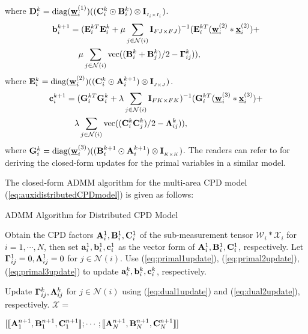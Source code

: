 \documentclass[journal]{IEEEtran}
\newcounter{thm}
\newcommand{\cpd}[3]{\llbracket #1, #2, #3 \rrbracket}
\newcommand{\A}{{\bf A}}
\newcommand{\B}{{\bf B}}
\newcommand{\C}{{\bf C}}
\newcommand{\D}{{\bf D}}
\newcommand{\E}{{\bf E}}
\newcommand{\Ten}[1]{\mathcal{#1}}
\newcommand{\andrey}[1]{\textcolor{red}{(Andrey says:  #1)}}
\newcommand{\revision}[1]{{\color{black} #1}} %
\newcommand{\bG}{{\bf G}}
\begin{document}
where $\D_i^k=\text{diag}(\underline{\bf w}_i^{(1)})((\C_i^k\odot \B_i^k)\otimes {\bf I}_{_{I_i\times I_i}})$.
\begin{align}
\label{eq:primal2update}
    {\bf b}_i^{k+1}
    &= (\E_i^{kT}\E_i^k+\mu\sum_{j\in\mathcal{N}(i)}{\bf I}_{{FJ\times FJ}})^{-1}(\E_i^{kT} (\underline{\bf w}_i^{(2)}* \underline{\bf x}_i^{(2)})+\nonumber\\
    &\quad\mu\sum_{j\in\mathcal{N}(i)}\text{vec}({(\B_i^{k}+\B_j^{k})}/{2}-{\bf{\Gamma}}_{ij}^{k})),
\end{align}
where $\E_i^k  =\text{diag}(\underline{\bf w}_i^{(2)})((\C_i^k\odot \A_i^{k+1})\otimes {\bf I}_{_{J\times J}})$.
\begin{align}
\label{eq:primal3update}
    {\bf c}_i^{k+1}
    &=(\bG_i^{kT}\bG_i^k+\lambda\sum_{j\in\mathcal{N}(i)}{\bf I}_{{FK\times FK}})^{-1}(\bG_i^{kT}(\underline{\bf w}_i^{(3)} * \underline{\bf x}_i^{(3)})+\nonumber\\
    &\quad\lambda\sum_{j\in\mathcal{N}(i)}\text{vec}((\C_i^{k}\C_j^{k})/{2}-{\bf{\Lambda}}_{ij}^{k})),
\end{align}
where  $\bG_i^k =\text{diag}(\underline{\bf w}_i^{(3)})((\B_i^{k+1}\odot \A_i^{k+1})\otimes {\bf I}_{_{K\times K}})$. \revision{The readers can refer to \cite{Liavas2015} for deriving the closed-form updates for the primal variables in a similar model.}

The closed-form ADMM algorithm for the multi-area CPD model (\ref{eq:auxidistributedCPDmodel}) is given as follows:
\begin{algorithm}
\caption{ADMM Algorithm for Distributed CPD Model}
 \begin{algorithmic}[1]
 \renewcommand{\algorithmicensure}{\textbf{Initialize:}}
\ENSURE Obtain the CPD factors $\A_i^1, \B_i^1, \C_i^1$ of the sub-measurement tensor $\Ten{W}_i *\Ten{X}_i$ for $i=1,\cdots, N$,  then set ${\bf a}_i^1, {\bf b}_i^1, {\bf c}_i^1$ as the vector form of $\A_i^1, \B_i^1, \C_i^1$, respectively.  Let ${\bf{\Gamma}}_{ij}^1=0, {\bf{\Lambda}}_{ij}^1=0$ for $j\in\mathcal{N}(i)$.
\STATE 
Use (\ref{eq:primal1update}), (\ref{eq:primal2update}), (\ref{eq:primal3update}) to update ${\bf a}_i^k, {\bf b}_i^k, {\bf c}_i^k$, respectively.

Update ${\bf{\Gamma}}_{ij}^k, {\bf{\Lambda}}_{ij}^k$ for $j\in\mathcal{N}(i)$ using (\ref{eq:dual1update}) and (\ref{eq:dual2update}), respectively.
  \ENDFOR
 \RETURN $\Ten{X}=$ 
 
 $[\cpd{\A_1^{n+1}}{\B_1^{n+1}}{\C_1^{n+1}}; \cdots; \cpd{\A_N^{n+1}}{\B_N^{n+1}}{\C_N^{n+1}}]$ 
 \end{algorithmic} 
 \label{Agorthim:ADMM}
\end{algorithm}
\end{document}
